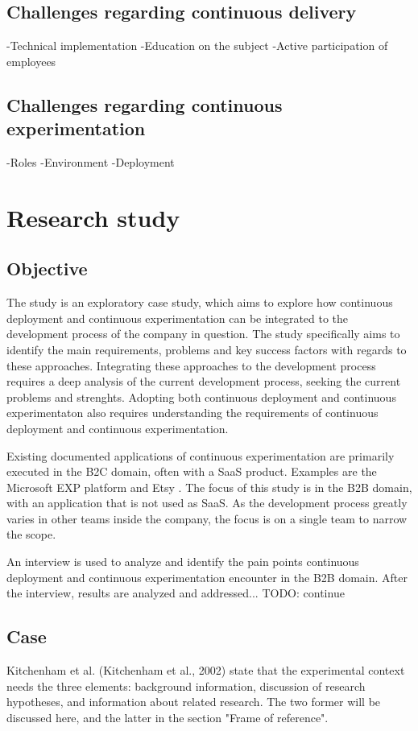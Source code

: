 \documentclass[english]{tktltiki2}
\theoremstyle{definition}
\theoremstyle{remark}
\begin{document}
\subsection{Challenges regarding continuous delivery}
-Technical implementation
-Education on the subject
-Active participation of employees

\subsection{Challenges regarding continuous experimentation}
-Roles
-Environment
-Deployment

\section{Research study}

\subsection{Objective} %

The study is an exploratory case study, which aims to explore how continuous deployment and continuous experimentation can be integrated to the development process of the company in question. The study specifically aims to identify the main requirements, problems and key success factors with regards to these approaches. Integrating these approaches to the development process requires a deep analysis of the current development process, seeking the current problems and strenghts. Adopting both continuous deployment and continuous experimentaton also requires understanding the requirements of continuous deployment and continuous experimentation. 

Existing documented applications of continuous experimentation are primarily executed in the B2C domain, often with a SaaS product. Examples are the Microsoft EXP platform \cite{ep} and Etsy \cite{}. The focus of this study is in the B2B domain, with an application that is not used as SaaS. As the development process greatly varies in other teams inside the company, the focus is on a single team to narrow the scope.

An interview is used to analyze and identify the pain points continuous deployment and continuous experimentation encounter in the B2B domain. After the interview, results are analyzed and addressed... TODO: continue

\subsection{Case} %
Kitchenham et al. (Kitchenham et al., 2002) state that the experimental context needs the three elements: background information, discussion of research hypotheses, and information about related research. The two former will be discussed here, and the latter in the section "Frame of reference".
\end{document}
